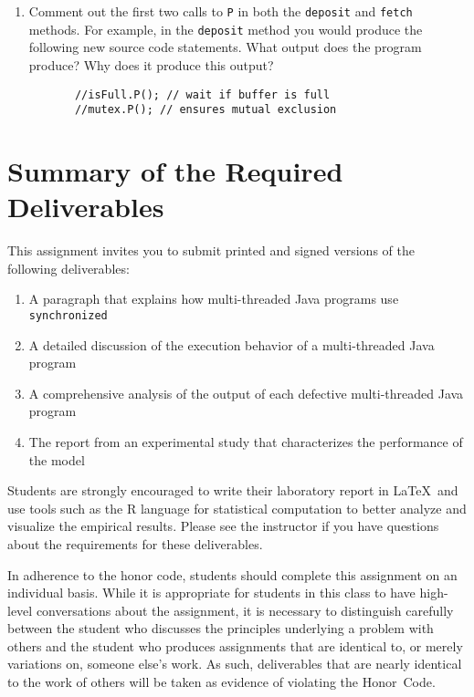 \begin{enumerate} 
 
  \item Comment out the first two calls to {\tt P} in both the {\tt deposit} and {\tt fetch} methods.  For example, in
    the {\tt deposit} method you would produce the following new source code statements.  What output does the program
    produce?  Why does it produce this output?  

    \begin{verbatim}
       //isFull.P(); // wait if buffer is full
       //mutex.P(); // ensures mutual exclusion
    \end{verbatim} 

\end{enumerate}


\section*{Summary of the Required Deliverables}

This assignment invites you to submit printed and signed versions of the following deliverables: 

\begin{enumerate} \item A paragraph that explains how multi-threaded Java programs use {\tt synchronized} \item A
    detailed discussion of the execution behavior of a multi-threaded Java program \item A comprehensive analysis of the
    output of each defective multi-threaded Java program \item The report from an experimental study that characterizes
    the performance of the model \end{enumerate}

Students are strongly encouraged to write their laboratory report in \LaTeX~and use tools such as the R language for
statistical computation to better analyze and visualize the empirical results. Please see the instructor if you have
questions about the requirements for these deliverables.

In adherence to the honor code, students should complete this assignment on an individual basis. While it is appropriate
for students in this class to have high-level conversations about the assignment, it is necessary to distinguish
carefully between the student who discusses the principles underlying a problem with others and the student who produces
assignments that are identical to, or merely variations on, someone else's work.  As such, deliverables that are nearly
identical to the work of others will be taken as evidence of violating the \mbox{Honor Code}.  



  
